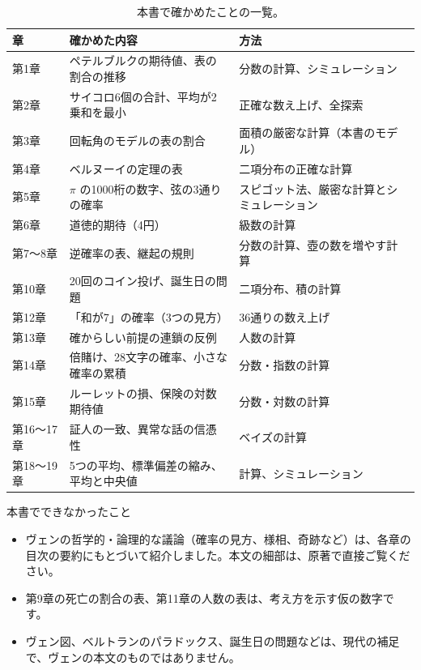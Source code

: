 \documentclass[a4paper,11pt,openany]{ltjsbook}
\begin{document}
\begin{table}[htbp]
\centering
\small
\begin{tabular}{lll}
\toprule
章 & 確かめた内容 & 方法\\
\midrule
第1章 & ペテルブルクの期待値、表の割合の推移 & 分数の計算、シミュレーション\\
第2章 & サイコロ6個の合計、平均が2乗和を最小 & 正確な数え上げ、全探索\\
第3章 & 回転角のモデルの表の割合 & 面積の厳密な計算（本書のモデル）\\
第4章 & ベルヌーイの定理の表 & 二項分布の正確な計算\\
第5章 & $\pi$ の1000桁の数字、弦の3通りの確率 & スピゴット法、厳密な計算とシミュレーション\\
第6章 & 道徳的期待（4円） & 級数の計算\\
第7〜8章 & 逆確率の表、継起の規則 & 分数の計算、壺の数を増やす計算\\
第10章 & 20回のコイン投げ、誕生日の問題 & 二項分布、積の計算\\
第12章 & 「和が7」の確率（3つの見方） & 36通りの数え上げ\\
第13章 & 確からしい前提の連鎖の反例 & 人数の計算\\
第14章 & 倍賭け、28文字の確率、小さな確率の累積 & 分数・指数の計算\\
第15章 & ルーレットの損、保険の対数期待値 & 分数・対数の計算\\
第16〜17章 & 証人の一致、異常な話の信憑性 & ベイズの計算\\
第18〜19章 & 5つの平均、標準偏差の縮み、平均と中央値 & 計算、シミュレーション\\
\bottomrule
\end{tabular}
\caption{本書で確かめたことの一覧。}
\end{table}

\begin{notebox}{本書でできなかったこと}
\begin{itemize}[leftmargin=*]
\item ヴェンの哲学的・論理的な議論（確率の見方、様相、奇跡など）は、各章の目次の要約にもとづいて紹介しました。本文の細部は、原著で直接ご覧ください。
\item 第9章の死亡の割合の表、第11章の人数の表は、考え方を示す仮の数字です。
\item ヴェン図、ベルトランのパラドックス、誕生日の問題などは、現代の補足で、ヴェンの本文のものではありません。
\end{itemize}
\end{notebox}
\end{document}
